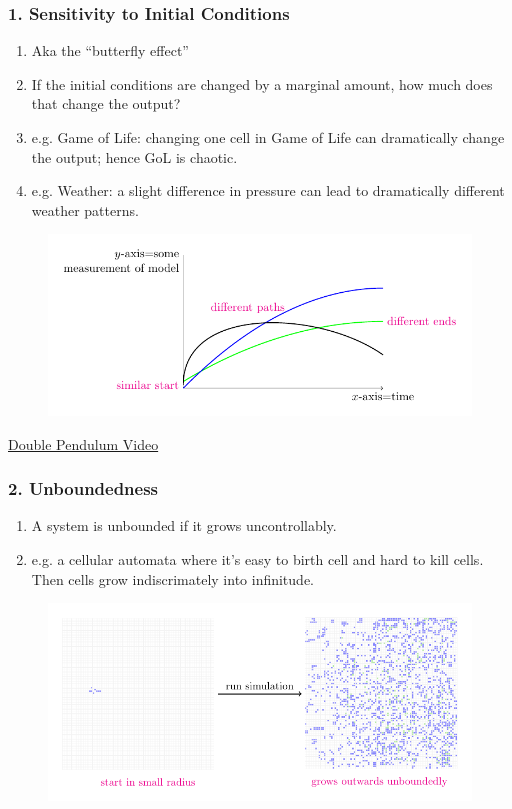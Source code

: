 \documentclass[11pt, handout]{beamer}
\begin{document}
\begin{frame}
    \frametitle{1. Sensitivity to Initial Conditions}
        \begin{enumerate}
            \item Aka the ``butterfly effect''
            \item If the initial conditions are changed by a marginal amount, how much does that change the output?
            \item e.g. Game of Life: changing one cell in Game of Life can dramatically change the output; hence GoL is chaotic.
            \item e.g. Weather: a slight difference in pressure can lead to dramatically different weather patterns.
        \end{enumerate}

        \begin{figure}
            \center
            \includegraphics[scale=0.7]{sensitivity_figure/sensitivity_figure.pdf}
        \end{figure}
        \small 
        \href{https://www.youtube.com/watch?v=QXf95_EKS6E}{Double Pendulum Video}
        \normalsize
\end{frame}
\begin{frame}
    \frametitle{2. Unboundedness}
        \begin{enumerate}
            \item A system is unbounded if it grows uncontrollably.
            \item e.g. a cellular automata where it's easy to birth cell and hard to kill cells. Then cells grow indiscrimately into infinitude.
        \end{enumerate}

        \begin{figure}
            \center
            \includegraphics[scale=0.7]{unboundedness_figure/unboundedness_figure.pdf}
        \end{figure}
\end{frame}
\end{document}
